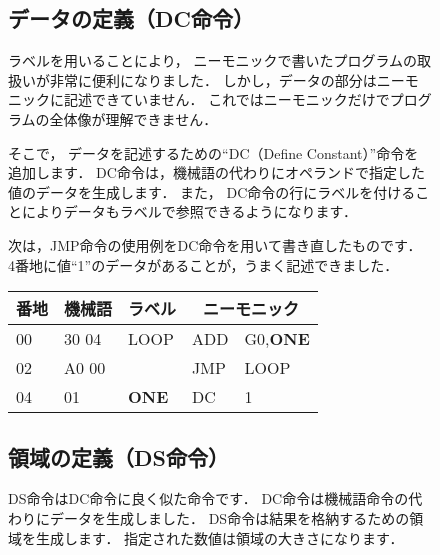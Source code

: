 \begin{figure}[btp]
\begin{framed}
\subsection*{データの定義（DC命令）}
ラベルを用いることにより，
ニーモニックで書いたプログラムの取扱いが非常に便利になりました．
しかし，データの部分はニーモニックに記述できていません．
これではニーモニックだけでプログラムの全体像が理解できません．

そこで，
データを記述するための``DC（Define Constant）''命令を追加します．
DC命令は，機械語の代わりにオペランドで指定した値のデータを生成します．
また，
DC命令の行にラベルを付けることによりデータもラベルで参照できるようになります．

次は，JMP命令の使用例をDC命令を用いて書き直したものです．
4番地に値``1''のデータがあることが，うまく記述できました．

{\small\tt\begin{center}
\begin{tabular}{|l|l|l|l l|} \hline
番地 & 機械語 & ラベル & \multicolumn{2}{|c|}{ニーモニック} \\
\hline
00 & 30 04 & LOOP       & ADD  & G0,{\bf ONE}  \\
02 & A0 00 &            & JMP  & LOOP          \\
04 & 01    & {\bf ONE}  & DC   & 1             \\
\hline
\end{tabular}
\end{center}}
\end{framed}
\end{figure}

\begin{figure}[btp]
\begin{framed}
\subsection*{領域の定義（DS命令）}
DS命令はDC命令に良く似た命令です．
DC命令は機械語命令の代わりにデータを生成しました．
DS命令は結果を格納するための領域を生成します．
指定された数値は領域の大きさになります．
\end{framed}
\end{figure}

